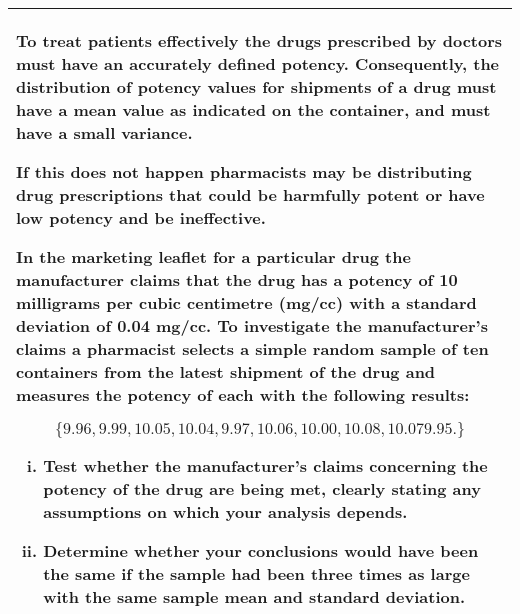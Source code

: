 \documentclass[a4paper,12pt]{article}
\begin{document}
\begin{table}[ht!]
     

\centering
     

\begin{tabular}{|p{15cm}|}
     

\hline 
\large
 

To treat patients effectively the drugs prescribed by doctors must have an accurately defined potency.  Consequently, the distribution of potency values for shipments of a drug must have a mean value as indicated on the container, and must have a small variance.  

If this does not happen pharmacists may be distributing drug prescriptions that could be harmfully potent or have low potency and be ineffective.  

In the marketing leaflet for a particular drug the manufacturer claims that the drug has a potency of 10 milligrams per cubic centimetre (mg/cc) with a standard deviation of 0.04 mg/cc.  To investigate the manufacturer's claims a pharmacist selects a simple random sample of ten containers from the latest shipment of the drug and measures the potency of each with the following results: 
 
\[\{9.96 ,  9.99 ,  10.05 ,  10.04,   9.97 ,  10.06  , 10.00 ,  10.08  , 10.07   9.95 . \}\]

\begin{enumerate}[(i)] 
\item  Test whether the manufacturer’s claims concerning the potency of the drug are being met, clearly stating any assumptions on which your analysis depends. 
 
\item  Determine whether your conclusions would have been the same if the sample had been three times as large with the same sample mean and standard deviation. 
\end{enumerate}

\\ \hline


\end{tabular}
    

\end{table}
\end{document}
